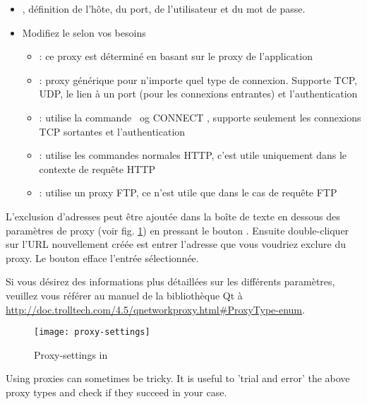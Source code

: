 {\setlength{\baselineskip}{1.4\baselineskip}
\begin{itemize}[label=--]
\item {}, définition de l'hôte, du port, de l'utilisateur et du mot de passe.
\item Modifiez le  selon vos besoins
 \begin{itemize}[label=--,itemsep=2pt]
  \item {}: ce proxy est déterminé en basant sur le proxy de l'application
  \item {}: proxy générique pour n'importe quel type de connexion. Supporte TCP, UDP, le lien à un port (pour les connexions entrantes) et l'authentication
  \item {}: utilise la commande \ og CONNECT \fg, supporte seulement les connexions TCP sortantes et l'authentication
  \item {}: utilise les commandes normales HTTP, c'est utile uniquement dans le contexte de requête HTTP
  \item {}: utilise un proxy FTP, ce n'est utile que dans le cas de requête FTP
\end{itemize}
\end{itemize}}
L'exclusion d'adresses peut être ajoutée dans la boîte de texte en dessous des paramètres de proxy (voir fig. \ref{fig:proxy-settings}) en pressant le bouton . Ensuite double-cliquer sur l'URL nouvellement créée est entrer l'adresse que vous voudriez exclure du proxy. Le bouton  efface l'entrée sélectionnée.

Si vous désirez des informations plus détaillées sur les différents paramètres, veuillez vous référer au manuel de la bibliothèque Qt à \url{http://doc.trolltech.com/4.5/qnetworkproxy.html#ProxyType-enum}.

\begin{figure}[ht]
   \begin{center}
   \caption{Proxy-settings in \qg \nixcaption}
   \texttt{[image: proxy-settings]}
   \label{fig:proxy-settings}
\end{center} 
\end{figure}

\begin{Astuce} \caption{\textsc{Using Proxies}}
Using proxies can sometimes be tricky. It is useful to 'trial and
error' the above proxy types and check if they succeed in your case.
\end{Astuce}

